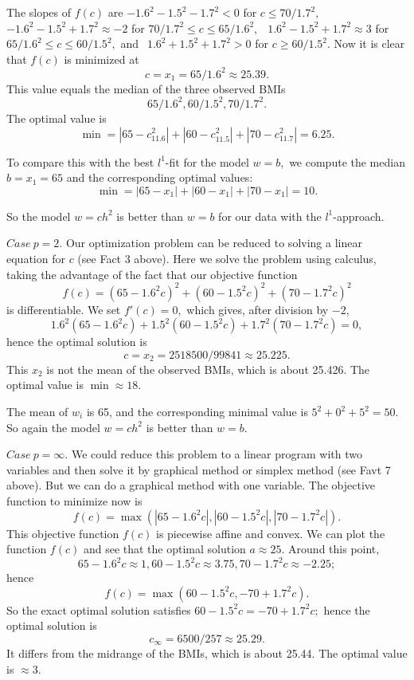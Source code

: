  The slopes of $f(c)$  are
\bigskip
  $-1.6^2-1.5^2-1.7^2 < 0$  for  $c \le  70/1.7^2,$
\smallskip
   $-1.6^2-1.5^2+1.7^2 \approx -2$  for  $   70/1.7^2 \le c \le 65/1.6^2,$
\smallskip
$ \ \ 1.6^2-1.5^2+1.7^2 \approx 3$  for  $  65/1.6^2 \le c \le 60/1.5^2,$
\smallskip
\noindent and  
\smallskip
$\  \ 1.6^2+1.5^2+1.7^2 > 0$ for  $c \ge 60/1.5^2.$
\bigskip
Now it is clear that $f(c)$ is minimized at 
$$c = x_1=65/1.6^2 \approx 25.39.$$
This value equals the median of the three  observed BMIs 
$$65/1.6^2, 60/1.5^2, 70/1.7^2. $$
The optimal value is
$$\min =  |65 - c_11.6^2| + |60 -c_11.5^2| + |70 -c_11.7^2| =6.25.$$


To compare this with the best $l^1$-fit for the model  $w=b,$ we compute
the median  $b=x_1 = 65$ and the corresponding optimal values:
$$\min = |65 - x_1| + |60 - x_1| + |70 - x_1| = 10.$$
 
 

So the model $w=ch^2$ is better than $w=b$ for our data with the $l^1$-approach.


 \medskip
$Case \ p=2.$  Our optimization problem can be reduced to solving a linear equation for $c$ (see Fact 3 above). Here we solve the problem using calculus, taking the advantage of the fact
that our objective function
$$ f(c) = (65- 1.6^2c)^2 + (60-1.5^2c)^2 + (70-1.7^2c)^2     $$
is differentiable. We set  $f'(c) = 0,$ which gives, after division by $-2$,
$$ 1.6^2(65- 1.6^2c) + 1.5^2(60-1.5^2c) + 1.7^2(70-1.7^2c) =0,$$
hence the optimal solution is  
$$c = x_2= 2518500/99841  \approx 25.225 .$$
This $x_2$ is not the mean of the observed  BMIs, which is about 25.426.   
The optimal value is 
$\min  \approx 18.$


The mean of $w_i$ is  65, and the corresponding minimal value is
$5^2+ 0^2+5^2= 50.$  So again  the model $w=ch^2$ is better than $w=b.$


 \medskip
$Case \ p=\infty.$ We could reduce  this problem  to a linear program with two variables and then solve it by graphical method or simplex method (see Favt 7 above). But we can do a graphical method with one variable. The objective
function to minimize now is
$$f(c) =\max( |65- 1.6^2c|, |60-1.5^2c|, |70-1.7^2c|).$$
This objective function $f(c)$  is piecewise affine and convex. We can plot the   function $f(c)$
and see that  the optimal solution $a \approx 25.$
Around this point,   
$$65- 1.6^2c \approx 1, 60-1.5^2c \approx 3.75,
70-1.7^2c \approx -2.25;$$
hence
$$f(c) =\max( 60-1.5^2c, -70+1.7^2c).$$
So the exact optimal solution satisfies $60-1.5^2c = -70+1.7^2c;$
hence the optimal solution is  
$$c_{\infty} = 6500/257 \approx 25.29.$$
It differs from  the midrange of the BMIs, which is about  25.44.
The optimal value is  $\approx 3.$

